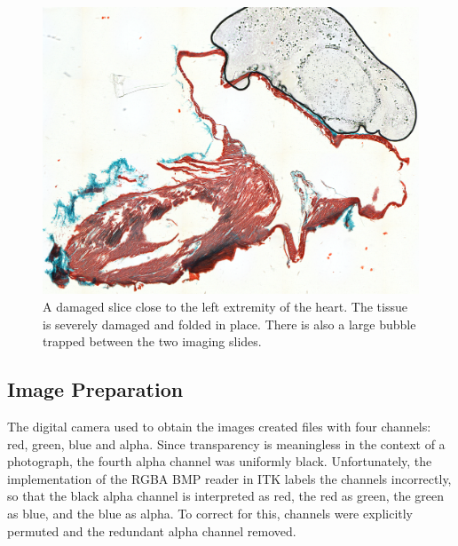     \begin{figure}[htbp]
      \centering
      \includegraphics[width=.8\textwidth]{Ch5/Figs/damaged_slice}
      \caption{A damaged slice close to the left extremity of the heart. The tissue is severely damaged and folded in place. There is also a large bubble trapped between the two imaging slides.}
      \label{fig:damaged_slice}
    \end{figure}
    
  
  \subsection{Image Preparation} %
  \label{sub:image_preparation}
  	The digital camera used to obtain the images created files with four channels: red, green, blue and alpha. Since transparency is meaningless in the context of a photograph, the fourth alpha channel was uniformly black. Unfortunately, the implementation of the RGBA BMP reader in ITK labels the channels incorrectly, so that the black alpha channel is interpreted as red, the red as green, the green as blue, and the blue as alpha. To correct for this, channels were explicitly permuted and the redundant alpha channel removed.
    

